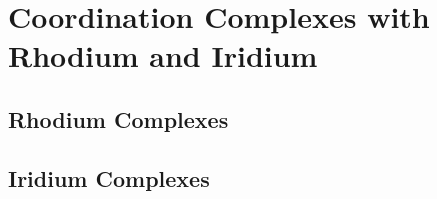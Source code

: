 
\chapter{Coordination Complexes with Rhodium and Iridium}
\label{ch:rhodium}

\section{Rhodium Complexes}
\label{section:experimental:rhodium}

\section{Iridium Complexes}
\label{section:experimental:iridium}